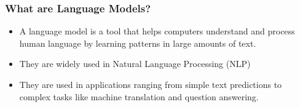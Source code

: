 

\begin{frame}
    \frametitle{What are Language Models?}
    \begin{center}

        \vspace{0.5cm}
        \begin{itemize}
            \item A language model is a tool that helps computers understand and process human language by learning patterns in large amounts of text.
            \item They are widely used in Natural Language Processing (NLP)
            \item They are used in applications ranging from simple text predictions to complex tasks like machine translation and question answering.
        \end{itemize}

            

    \end{center}
\end{frame}
